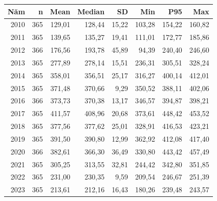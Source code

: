 \begin{tabular}{rrrrrrrr}
\toprule
Năm & n & Mean & Median & SD & Min & P95 & Max \\
\midrule
2010 & 365 & 129{,}01 & 128{,}44 & 15{,}22 & 103{,}28 & 154{,}22 & 160{,}82 \\
2011 & 365 & 139{,}65 & 135{,}27 & 19{,}41 & 111{,}01 & 172{,}77 & 185{,}86 \\
2012 & 366 & 176{,}56 & 193{,}78 & 45{,}89 & 94{,}39 & 240{,}40 & 246{,}60 \\
2013 & 365 & 277{,}89 & 278{,}14 & 15{,}51 & 236{,}31 & 305{,}51 & 328{,}24 \\
2014 & 365 & 358{,}01 & 356{,}51 & 25{,}17 & 316{,}27 & 400{,}14 & 412{,}01 \\
2015 & 365 & 371{,}48 & 370{,}66 & 9{,}29 & 350{,}52 & 388{,}11 & 402{,}06 \\
2016 & 366 & 373{,}73 & 370{,}38 & 13{,}17 & 346{,}57 & 394{,}87 & 398{,}21 \\
2017 & 365 & 411{,}57 & 408{,}96 & 20{,}68 & 373{,}61 & 448{,}42 & 453{,}52 \\
2018 & 365 & 377{,}56 & 377{,}62 & 25{,}01 & 328{,}91 & 416{,}53 & 423{,}21 \\
2019 & 365 & 391{,}50 & 390{,}80 & 12{,}99 & 362{,}92 & 412{,}08 & 417{,}40 \\
2020 & 366 & 382{,}61 & 366{,}30 & 36{,}49 & 330{,}80 & 443{,}42 & 457{,}49 \\
2021 & 365 & 305{,}25 & 313{,}55 & 32{,}81 & 244{,}42 & 342{,}80 & 351{,}85 \\
2022 & 365 & 231{,}00 & 230{,}35 & 9{,}59 & 209{,}54 & 246{,}67 & 251{,}39 \\
2023 & 365 & 213{,}61 & 212{,}16 & 16{,}43 & 180{,}26 & 239{,}48 & 243{,}57 \\
\bottomrule
\end{tabular}
